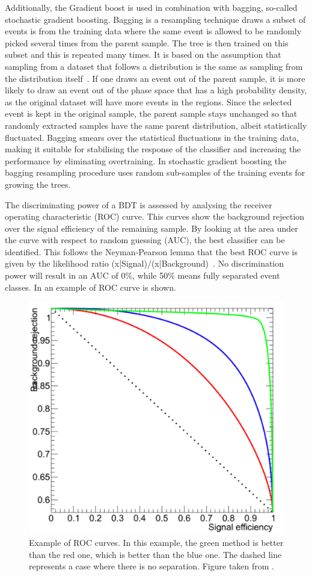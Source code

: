 Additionally, the Gradient boost is used in combination with bagging, so-called stochastic gradient boosting. Bagging is a resampling technique draws a subset of events is  from the training data where the same event is allowed to be randomly picked several times from the parent sample. The tree is then trained on this subset and this is repeated many times. It is based on the assumption that sampling from a dataset that follows a distribution is the same as sampling from the distribution itself~\cite{Behnke:2013:DAH:2564838}. If one draws an event out of the parent sample, it is more likely to draw an event out of the phase space that has a high probability density, as the original dataset will have more events in the regions. Since the selected event is kept in the original sample, the parent sample stays unchanged so that randomly extracted samples have the same parent distribution, albeit statistically fluctuated.  Bagging smears over the statistical fluctuations in the training data, making it suitable for stabilising the response of the classifier and increasing the performance by eliminating overtraining.  In stochastic gradient boosting the bagging resampling procedure uses random sub-samples of the training events for growing the trees. 


The discriminating power of a BDT is assessed by analysing the receiver operating characteristic (ROC) curve. This curves show the background rejection over the signal efficiency of the remaining sample. By looking at the area under the curve with respect to random guessing (AUC), the best classifier can be identified. This follows the Neyman-Pearson lemma that the best ROC curve is given by the likelihood ratio \like(x|Signal)/\like(x|Background)~\cite{Behnke:2013:DAH:2564838}. No discrimination power will result in an AUC of 0\%, while 50\%  means fully separated event classes. In  an example of ROC curve is shown. 
\begin{figure}[htbp]
	\centering
	\includegraphics[width=0.5\linewidth]{3_Analysis_techniques/Figures/ROC}
	\caption{Example of ROC curves. In this example, the green method is better than the red one, which is better than the blue one. The dashed line represents a case where there is no separation. Figure taken from \cite{ROC}.}
	\label{fig:ROC}
\end{figure}




